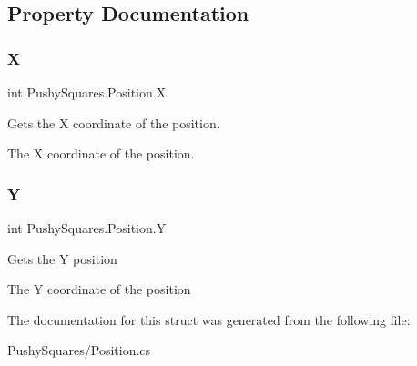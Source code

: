 \subsection{Property Documentation}
\mbox{\label{struct_pushy_squares_1_1_position_a35115084c01a6abc427fcebe771d6a87}} 
\subsubsection{\texorpdfstring{X}{X}}
{\footnotesize\ttfamily int Pushy\+Squares.\+Position.\+X\hspace{0.3cm}{\ttfamily [get]}}



Gets the X coordinate of the position. 

The X coordinate of the position.\mbox{\label{struct_pushy_squares_1_1_position_a976a349430fe3bdf57db6eb77f9b0b84}} 
\subsubsection{\texorpdfstring{Y}{Y}}
{\footnotesize\ttfamily int Pushy\+Squares.\+Position.\+Y\hspace{0.3cm}{\ttfamily [get]}}



Gets the Y position 

The Y coordinate of the position

The documentation for this struct was generated from the following file\+:\begin{DoxyCompactItemize}
\item 
Pushy\+Squares/Position.\+cs\end{DoxyCompactItemize}
